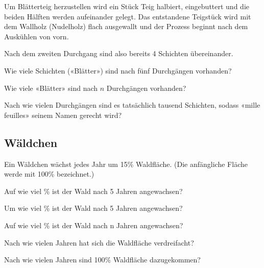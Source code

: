 Um Blätterteig herzustellen wird ein Stück Teig halbiert, eingebuttert
und die beiden Hälften werden aufeinander gelegt. Das entstandene
Teigstück wird mit dem Wallholz (Nudelholz) flach ausgewallt und der
Prozess beginnt nach dem Auskühlen von vorn.

Nach dem zweiten Durchgang sind also bereits 4 Schichten übereinander.

\begin{bbwAufgabenBlock}
\item Wie viele Schichten («Blätter») sind nach fünf Durchgängen
vorhanden?  \plz{}

\item Wie viele «Blätter» sind nach $n$ Durchgängen
vorhanden?  \plz{}

\item Nach wie vielen Durchgängen sind es tatsächlich tausend
Schichten, sodass «mille feuilles» seinem Namen gerecht
wird? 

\end{bbwAufgabenBlock}

\platzFuerBerechnungenBisEndeSeite{}
\subsection{Wäldchen}
Ein Wäldchen wächst jedes Jahr um 15\% Waldfläche. (Die anfängliche Fläche werde mit
100\% bezeichnet.)
\begin{bbwAufgabenBlock}
\item Auf wie viel \% ist der Wald nach 5 Jahren angewachsen?  \plz{}
\item Um wie viel \% ist der Wald nach 5 Jahren angewachsen?  \plz{}
\item Auf wie viel \% ist der Wald nach n Jahren
angewachsen?  \plz{} \noTRAINER{\newpage}
\item Nach wie vielen Jahren hat sich die Waldfläche
verdreifacht?  \plz{}
\item Nach wie vielen Jahren sind 100\% Waldfläche
dazugekommen?  \plz{}
\end{bbwAufgabenBlock}

\platzFuerBerechnungenBisEndeSeite{}

